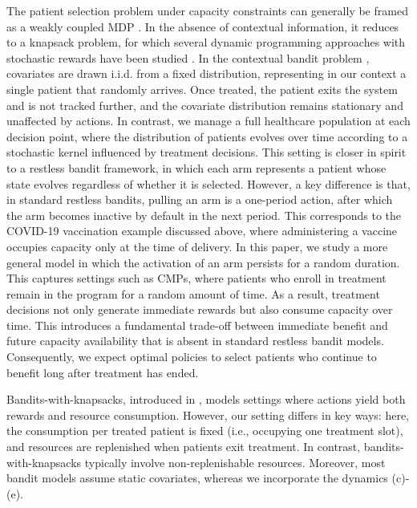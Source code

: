 \documentclass[12pt,a4paper]{article}
\begin{document}
   The patient selection problem under capacity constraints can generally be framed as a weakly coupled MDP \citep{adelman_weakly}.
    In the absence of contextual information, it reduces to a knapsack problem, for which several dynamic programming approaches with stochastic rewards have been studied \citep{aouad,bertsimas2002,clautiaux}. 
    In the contextual bandit problem \citep{langford}, covariates are drawn i.i.d. from a fixed distribution, representing in our context a single patient that randomly arrives. Once treated, the patient exits the system and is not tracked further, and the covariate distribution remains stationary and unaffected by actions. In contrast, we manage a full healthcare population at each decision point, where the distribution of patients evolves over time according to a stochastic kernel influenced by treatment decisions. This setting is closer in spirit to a restless bandit framework, in which each arm represents a patient whose state evolves regardless of whether it is selected. However, a key difference is that, in standard restless bandits, pulling an arm is a one-period action, after which the arm becomes inactive by default in the next period. This corresponds to the COVID-19 vaccination example discussed above, where administering a vaccine occupies capacity only at the time of delivery. In this paper, we study a more general model in which the activation of an arm persists for a random duration. This captures settings such as CMPs, where patients who enroll in treatment remain in the program for a random amount of time. As a result, treatment decisions not only generate immediate rewards but also consume capacity over time. This introduces a fundamental trade-off between immediate benefit and future capacity availability that is absent in standard restless bandit models. Consequently, we expect optimal policies to select patients who continue to benefit long after treatment has ended.
    \color{black}
    
     Bandits-with-knapsacks, introduced in \cite{banditswithknapsacks}, models settings where actions yield both rewards and resource consumption. However, our setting differs in key ways: here, the consumption per treated patient is fixed (i.e., occupying one treatment slot), and resources are replenished when patients exit treatment. In contrast, bandits-with-knapsacks typically involve non-replenishable resources. Moreover, most bandit models assume static covariates, whereas we incorporate the dynamics (c)-(e).
\color{black}
\end{document}
